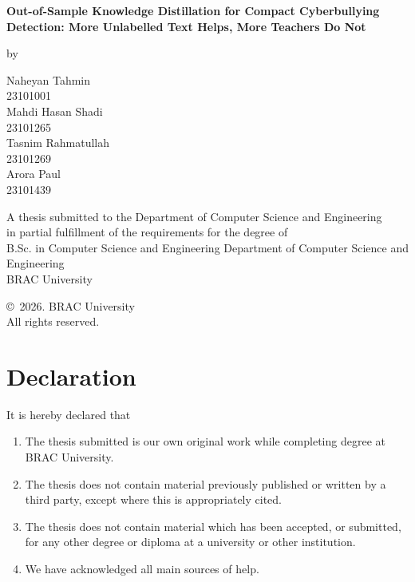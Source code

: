 
\begin{titlepage}
\centering
\vspace*{0.5cm}
{\LARGE\bfseries Out-of-Sample Knowledge Distillation for Compact Cyberbullying Detection: More Unlabelled Text Helps, More Teachers Do Not\par}
\vspace{1.4cm}
{\large by\par}
\vspace{0.8cm}
{\large
Naheyan Tahmin\\ 23101001\\[0.35cm]
Mahdi Hasan Shadi\\ 23101265\\[0.35cm]
Tasnim Rahmatullah\\ 23101269\\[0.35cm]
Arora Paul\\ 23101439\par}
\vspace{1.4cm}
A thesis submitted to the Department of Computer Science and Engineering\\
in partial fulfillment of the requirements for the degree of\\
B.Sc. in Computer Science and Engineering
\vfill
Department of Computer Science and Engineering\\
BRAC University\\
\thesisdate
\vspace{1.2cm}

\copyright\ 2026. BRAC University\\
All rights reserved.
\end{titlepage}

\setcounter{page}{1}

\chapter*{Declaration}
It is hereby declared that
\begin{enumerate}
  \item The thesis submitted is our own original work while completing degree at BRAC University.
  \item The thesis does not contain material previously published or written by a third party, except
    where this is appropriately cited.
  \item The thesis does not contain material which has been accepted, or submitted, for any other degree
    or diploma at a university or other institution.
  \item We have acknowledged all main sources of help.
\end{enumerate}

